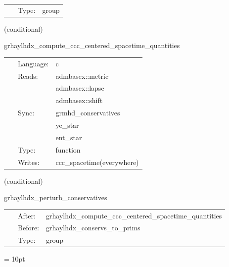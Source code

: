 \documentclass{article}
\begin{document}
 \begin{tabular*}{160mm}{cll} 
~ & Type:  & group \\ 
\end{tabular*} 


\vspace{5mm}

   (conditional) 

\hspace{5mm} grhaylhdx\_compute\_ccc\_centered\_spacetime\_quantities 

\hspace{5mm}{\it interpolate spacetime quantities to cell centers } 


\hspace{5mm}

 \begin{tabular*}{160mm}{cll} 
~ & Language:  & c \\ 
~ & Reads:  & admbasex::metric \\ 
~& ~ &admbasex::lapse\\ 
~& ~ &admbasex::shift\\ 
~ & Sync:  & grmhd\_conservatives \\ 
~& ~ &ye\_star\\ 
~& ~ &ent\_star\\ 
~ & Type:  & function \\ 
~ & Writes:  & ccc\_spacetime(everywhere) \\ 
\end{tabular*} 


\vspace{5mm}

   (conditional) 

\hspace{5mm} grhaylhdx\_perturb\_conservatives 

\hspace{5mm}{\it perturb conservatives before con2prim } 


\hspace{5mm}

 \begin{tabular*}{160mm}{cll} 
~ & After:  & grhaylhdx\_compute\_ccc\_centered\_spacetime\_quantities \\ 
~ & Before:  & grhaylhdx\_conservs\_to\_prims \\ 
~ & Type:  & group \\ 
\end{tabular*} 



\vspace{5mm}\parskip = 10pt 
\end{document}
